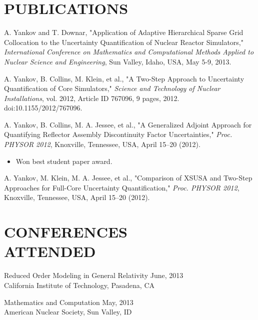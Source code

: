 \documentclass[margin, 10pt]{res} %
\begin{document}
\begin{resume}

\section{PUBLICATIONS}

A. Yankov and T. Downar, "Application of Adaptive Hierarchical Sparse Grid Collocation to the Uncertainty Quantification of Nuclear Reactor Simulators," \textit{International Conference on Mathematics and Computational Methods Applied to Nuclear Science and Engineering}, Sun Valley, Idaho, USA, May 5-9, 2013.

A. Yankov, B. Collins, M. Klein, et al., "A Two-Step Approach to Uncertainty Quantification of Core Simulators," \textit{Science and Technology of Nuclear Installations}, vol. 2012, Article ID 767096, 9 pages, 2012. doi:10.1155/2012/767096.

A. Yankov, B. Collins, M. A. Jessee, et al., "A Generalized Adjoint Approach for Quantifying Reflector Assembly Discontinuity Factor Uncertainties," \textit{Proc. PHYSOR 2012}, Knoxville, Tennessee, USA, April 15–20 (2012). %
\begin{itemize} 
\item Won best student paper award.
\end{itemize}

A. Yankov, M. Klein, M. A. Jessee, et al., "Comparison of XSUSA and Two-Step Approaches for Full-Core Uncertainty Quantification," \textit{Proc. PHYSOR 2012}, Knoxville, Tennessee, USA, April 15–20 (2012).


\section{CONFERENCES \\ ATTENDED}

Reduced Order Modeling in General Relativity \hfill June, 2013 \\
California Institute of Technology, Pasadena, CA

Mathematics and Computation \hfill May, 2013 \\
American Nuclear Society, Sun Valley, ID


\end{resume}
\end{document}
